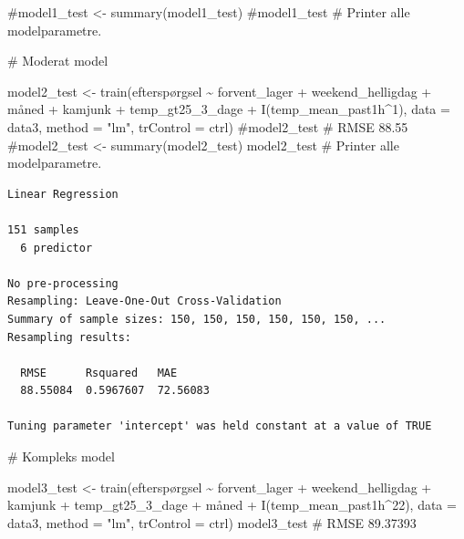 \documentclass[
  12pt,
  a4paper,
  DIV=11,
  numbers=noendperiod]{scrartcl}
\newenvironment{Shaded}{\begin{snugshade}}{\end{snugshade}}
\newcommand{\AttributeTok}[1]{\textcolor[rgb]{0.40,0.45,0.13}{#1}}
\newcommand{\CommentTok}[1]{\textcolor[rgb]{0.37,0.37,0.37}{#1}}
\newcommand{\DecValTok}[1]{\textcolor[rgb]{0.68,0.00,0.00}{#1}}
\newcommand{\FunctionTok}[1]{\textcolor[rgb]{0.28,0.35,0.67}{#1}}
\newcommand{\NormalTok}[1]{\textcolor[rgb]{0.00,0.23,0.31}{#1}}
\newcommand{\OtherTok}[1]{\textcolor[rgb]{0.00,0.23,0.31}{#1}}
\newcommand{\SpecialCharTok}[1]{\textcolor[rgb]{0.37,0.37,0.37}{#1}}
\newcommand{\StringTok}[1]{\textcolor[rgb]{0.13,0.47,0.30}{#1}}
\begin{document}
\begin{Shaded}
\begin{Highlighting}[numbers=left,,]
\CommentTok{\#model1\_test \textless{}{-} summary(model1\_test)}
\CommentTok{\#model1\_test \# Printer alle modelparametre.}

\CommentTok{\# Moderat model}

\NormalTok{model2\_test }\OtherTok{\textless{}{-}} \FunctionTok{train}\NormalTok{(efterspørgsel }\SpecialCharTok{\textasciitilde{}}\NormalTok{ forvent\_lager }\SpecialCharTok{+}
\NormalTok{                       weekend\_helligdag }\SpecialCharTok{+}\NormalTok{ måned }\SpecialCharTok{+}
\NormalTok{                       kamjunk }\SpecialCharTok{+} 
\NormalTok{                       temp\_gt25\_3\_dage }\SpecialCharTok{+} 
                       \FunctionTok{I}\NormalTok{(temp\_mean\_past1h}\SpecialCharTok{\^{}}\DecValTok{1}\NormalTok{), }\AttributeTok{data =}\NormalTok{ data3,}
                       \AttributeTok{method =} \StringTok{"lm"}\NormalTok{, }\AttributeTok{trControl =}\NormalTok{ ctrl)}
\CommentTok{\#model2\_test \# RMSE 88.55}
\CommentTok{\#model2\_test \textless{}{-} summary(model2\_test)}
\NormalTok{model2\_test }\CommentTok{\# Printer alle modelparametre.}
\end{Highlighting}
\end{Shaded}

\begin{verbatim}
Linear Regression 

151 samples
  6 predictor

No pre-processing
Resampling: Leave-One-Out Cross-Validation 
Summary of sample sizes: 150, 150, 150, 150, 150, 150, ... 
Resampling results:

  RMSE      Rsquared   MAE     
  88.55084  0.5967607  72.56083

Tuning parameter 'intercept' was held constant at a value of TRUE
\end{verbatim}

\begin{Shaded}
\begin{Highlighting}[numbers=left,,]
\CommentTok{\# Kompleks model}

\NormalTok{model3\_test }\OtherTok{\textless{}{-}} \FunctionTok{train}\NormalTok{(efterspørgsel }\SpecialCharTok{\textasciitilde{}}\NormalTok{ forvent\_lager }\SpecialCharTok{+} 
\NormalTok{                       weekend\_helligdag }\SpecialCharTok{+}
\NormalTok{                       kamjunk }\SpecialCharTok{+} 
\NormalTok{                       temp\_gt25\_3\_dage }\SpecialCharTok{+} 
\NormalTok{                       måned }\SpecialCharTok{+}
                       \FunctionTok{I}\NormalTok{(temp\_mean\_past1h}\SpecialCharTok{\^{}}\DecValTok{22}\NormalTok{), }\AttributeTok{data =}\NormalTok{ data3, }
                       \AttributeTok{method =} \StringTok{"lm"}\NormalTok{, }\AttributeTok{trControl =}\NormalTok{ ctrl)}
\NormalTok{model3\_test }\CommentTok{\# RMSE 89.37393}
\end{Highlighting}
\end{Shaded}
\end{document}
